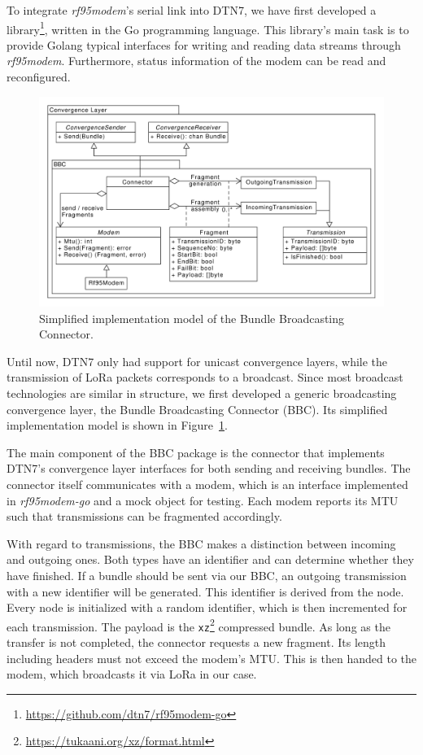 To integrate \textit{rf95modem}'s serial link into DTN7, we have first developed a  library\footnote{\url{https://github.com/dtn7/rf95modem-go}},  written in the Go programming language.
This library's main task is to provide Golang typical interfaces for writing and reading data streams through \textit{rf95modem}.
Furthermore, status information of the modem can be read and reconfigured.

\begin{figure}[ht!]
    \centering
    \includegraphics[width=1.0\columnwidth]{gfx/dtn7-bbc.pdf}
    \caption{Simplified implementation model of the Bundle Broadcasting Connector.}
    \label{hoechst2020lora:fig:dtn7_bbc_uml}
\end{figure}

Until now, DTN7 only had support for unicast convergence layers, while the transmission of LoRa packets corresponds to a broadcast.
Since most broadcast technologies are similar in structure, we first developed a generic broadcasting convergence layer, the Bundle Broadcasting Connector (BBC).
Its simplified implementation model is shown in Figure~\ref{hoechst2020lora:fig:dtn7_bbc_uml}.

The main component of the BBC package is the connector that implements DTN7's convergence layer interfaces for both sending and receiving bundles.
The connector itself communicates with a modem, which is an interface implemented in \textit{rf95modem-go} and a mock object for testing.
Each modem reports its MTU such that transmissions can be fragmented accordingly.

With regard to transmissions, the BBC makes a distinction between incoming and outgoing ones.
Both types have an identifier and can determine whether they have finished.
If a bundle should be sent via our BBC, an outgoing transmission with a new identifier will be generated.
This identifier is derived from the node.
Every node is initialized with a random identifier, which is then incremented for each transmission.
The payload is the \texttt{xz}\footnote{\url{https://tukaani.org/xz/format.html}} compressed bundle.
As long as the transfer is not completed, the connector requests a new fragment.
Its length including headers must not exceed the modem's MTU.
This is then handed to the modem, which broadcasts it via LoRa in our case.
 
